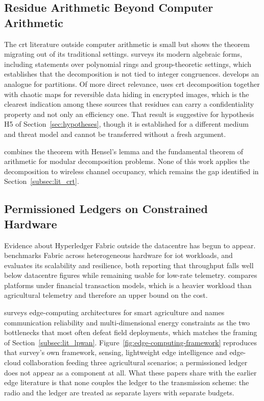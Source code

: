 \documentclass[12pt,a4paper,oneside]{book}
\begin{document}
\subsection{Residue Arithmetic Beyond Computer Arithmetic}
\label{subsec:lit_crt_extended}

The \gls{crt} literature outside computer arithmetic is small but shows the
theorem migrating out of its traditional settings.
\textcite{luo2023researchapplication} surveys its modern algebraic forms,
including statements over polynomial rings and group-theoretic settings, which
establishes that the decomposition is not tied to integer congruences.
\textcite{seethalakshmi2023chineseremainder} develops an analogue for
partitions. Of more direct relevance,
\textcite{yavuz2025reversibledata} uses \gls{crt} decomposition together with
chaotic maps for reversible data hiding in encrypted images, which is the
clearest indication among these sources that residues can carry a
confidentiality property and not only an efficiency one. That result is
suggestive for
hypothesis H5 of Section~\ref{sec:hypotheses}, though it is established for a
different medium and threat model and cannot be transferred without a fresh
argument.

\textcite{oktaviansyah2025hybridizinghensel} combines the theorem with Hensel's
lemma and the fundamental theorem of arithmetic for modular decomposition
problems. None of this work applies the decomposition to wireless channel
occupancy, which remains the gap identified in Section~\ref{subsec:lit_crt}.

\subsection{Permissioned Ledgers on Constrained Hardware}
\label{subsec:lit_edge_extended}

Evidence about Hyperledger Fabric outside the datacentre has begun to appear.
\textcite{zulkarnain2025performancebenchmarking} benchmarks Fabric across
heterogeneous hardware for \gls{iot} workloads, and
\textcite{pebriyanti2025evaluationscalability} evaluates its scalability and
resilience, both reporting that throughput falls well below datacentre figures
while remaining usable for low-rate telemetry.
\textcite{kwadzode2025performancecomparison} compares platforms under financial
transaction models, which is a heavier workload than agricultural telemetry and
therefore an upper bound on the cost.

\textcite{gong2025edge} surveys edge-computing architectures for smart
agriculture and names communication reliability and multi-dimensional energy
constraints as the two bottlenecks that most often defeat field deployments,
which matches the framing of Section~\ref{subsec:lit_lpwan}. Figure~\ref{fig:edge-computing-framework}
reproduces that survey's own framework, sensing, lightweight edge
intelligence and edge-cloud collaboration feeding three agricultural
scenarios; a permissioned ledger does not appear as a component at all. What
these papers share with the earlier edge literature is that none couples the
ledger to the transmission scheme: the radio and the ledger are treated as
separate layers with separate budgets.
\end{document}
